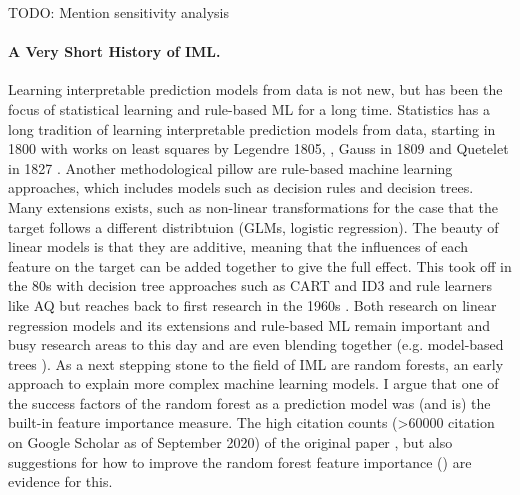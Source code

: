 \documentclass[runningheads]{llncs}
\begin{document}
TODO: Mention sensitivity analysis


\paragraph{A Very Short History of IML.}
Learning interpretable prediction models from data is not new, but has been the focus of statistical learning and rule-based ML for a long time.
Statistics has a long tradition of learning interpretable prediction  models from data, starting in 1800 \cite{stigler1986history} with works on least squares by Legendre 1805, \cite{legendre1805nouvelles}, Gauss in 1809 \cite{gauss1809theoria} and Quetelet in 1827 \cite{quetelet1827recherches}.
Another methodological pillow are rule-based machine learning approaches, which includes models such as decision rules and decision trees.
Many extensions exists, such as non-linear transformations for the case that the target follows a different distribtuion (GLMs, logistic regression).
The beauty of linear models is that they are additive, meaning that the influences of each feature on the target can be added together to give the full effect.
  This took off in the 80s with decision tree approaches such as CART and ID3 and rule learners like AQ \cite{furnkranz2012foundations} but reaches back to first research in the 1960s \cite{hajek1966guha}.
Both research on linear regression models and its extensions and rule-based ML remain important and busy research areas to this day and are even blending together (e.g. model-based trees \cite{zeileis2008model}).
As a next stepping stone to the field of IML are random forests, an early approach to explain more complex machine learning models.
I argue that one of the success factors of the random forest as a prediction model was (and is) the built-in feature importance measure.
The high citation counts (>60000 citation on Google Scholar as of September 2020) of the original paper \cite{breiman2001random}, but also suggestions for how to improve the random forest feature importance (\cite{strobl2008conditional,strobl2007bias,hapfelmeier2014new,ishwaran2007variable}) are evidence for this.
\end{document}
